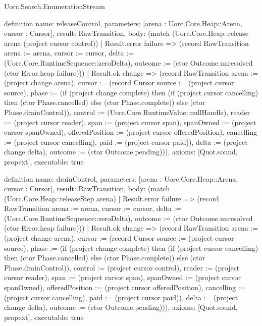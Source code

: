 \begin{lexlean}{Uorc.Search.EnumerationStream}
\begin{semanticmodule}
definition{
  name: releaseControl,
  parameters: [arena : Uorc.Core.Heap::Arena, cursor : Cursor],
  result: RawTransition,
  body: (match (Uorc.Core.Heap::release arena (project cursor control))
    | Result.error failure => (record RawTransition {arena := arena, cursor := cursor, delta := (Uorc.Core.RuntimeSequence::zeroDelta), outcome := (ctor Outcome.unresolved (ctor Error.heap failure))})
    | Result.ok change => (record RawTransition {arena := (project change arena), cursor := (record Cursor {source := (project cursor source), phase := (if (project change complete) then (if (project cursor cancelling) then (ctor Phase.cancelled) else (ctor Phase.complete)) else (ctor Phase.drainControl)), control := (Uorc.Core.RuntimeValue::nullHandle), reader := (project cursor reader), span := (project cursor span), spanOwned := (project cursor spanOwned), offeredPosition := (project cursor offeredPosition), cancelling := (project cursor cancelling), paid := (project cursor paid)}), delta := (project change delta), outcome := (ctor Outcome.pending)})),
  axioms: [Quot.sound, propext],
  executable: true
}

definition{
  name: drainControl,
  parameters: [arena : Uorc.Core.Heap::Arena, cursor : Cursor],
  result: RawTransition,
  body: (match (Uorc.Core.Heap::releaseStep arena)
    | Result.error failure => (record RawTransition {arena := arena, cursor := cursor, delta := (Uorc.Core.RuntimeSequence::zeroDelta), outcome := (ctor Outcome.unresolved (ctor Error.heap failure))})
    | Result.ok change => (record RawTransition {arena := (project change arena), cursor := (record Cursor {source := (project cursor source), phase := (if (project change complete) then (if (project cursor cancelling) then (ctor Phase.cancelled) else (ctor Phase.complete)) else (ctor Phase.drainControl)), control := (project cursor control), reader := (project cursor reader), span := (project cursor span), spanOwned := (project cursor spanOwned), offeredPosition := (project cursor offeredPosition), cancelling := (project cursor cancelling), paid := (project cursor paid)}), delta := (project change delta), outcome := (ctor Outcome.pending)})),
  axioms: [Quot.sound, propext],
  executable: true
}


\end{semanticmodule}
\end{lexlean}
